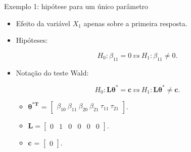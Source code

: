 \documentclass[
  ignorenonframetext,
  serif,
  professionalfont,
  usenames,
  dvipsnames,
  aspectratio = 169]{beamer}
\begin{document}
\begin{frame}{Exemplo 1: hipótese para um único parâmetro}
\protect\hypertarget{exemplo-1-hipuxf3tese-para-um-uxfanico-paruxe2metro}{}
\begin{itemize}
  \itemsep 2ex
  
  \item Efeito da variável $X_1$ apenas sobre a primeira resposta. 

  \item Hipóteses:

$$H_0: \beta_{11} = 0 \ vs \ H_1: \beta_{11} \neq 0.$$

  \item Notação do teste Wald:
  
$$H_0: \boldsymbol{L}\boldsymbol{\theta^{*}} = \boldsymbol{c} \ vs \ H_1: \boldsymbol{L}\boldsymbol{\theta^{*}} \neq \boldsymbol{c}.$$  

  \begin{itemize}
  
    \item $\boldsymbol{\theta^{*T}}$ = $\begin{bmatrix} \beta_{10} \  \beta_{11} \ \beta_{20} \ \beta_{21} \ \tau_{11} \ \tau_{21} \end{bmatrix}$.

    \item $\boldsymbol{L} = \begin{bmatrix} 0 & 1 & 0 & 0 & 0 & 0  \end{bmatrix}.$
 
  \item $\boldsymbol{c}$ = $\begin{bmatrix} 0 \end{bmatrix}.$

  \end{itemize}
  
\end{itemize}
\end{frame}
\end{document}
